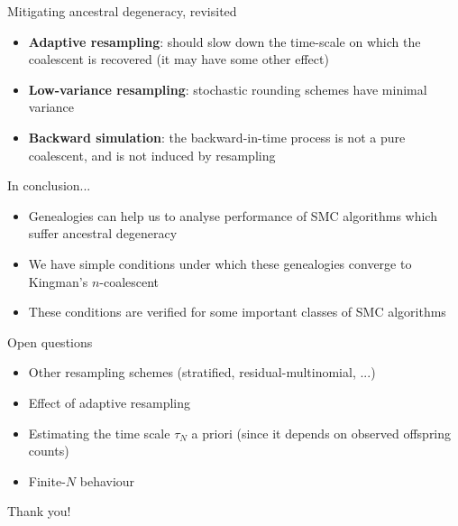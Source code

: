 \documentclass[aspectratio=169]{beamer}
\theoremstyle{definition}
\begin{document}
\begin{frame}{Mitigating ancestral degeneracy, revisited}
\begin{itemize}%
\item \textbf{Adaptive resampling}: should slow down the time-scale on which the coalescent is recovered (it may have some other effect)
\item \textbf{Low-variance resampling}: stochastic rounding schemes have minimal variance
\item \textbf{Backward simulation}: the backward-in-time process is not a pure coalescent, and is not induced by resampling
\end{itemize}
\end{frame}


\begin{frame}{In conclusion...}
\begin{itemize}
\item Genealogies can help us to analyse performance of SMC algorithms which suffer ancestral degeneracy
\item We have simple conditions under which these genealogies converge to Kingman's $n$-coalescent
\item These conditions are verified for some important classes of SMC algorithms
\end{itemize}
\end{frame}


\begin{frame}{Open questions}
\begin{itemize}
\item Other resampling schemes (stratified, residual-multinomial, ...)
\item Effect of adaptive resampling
\item Estimating the time scale $\tau_N$ a priori (since it depends on observed offspring counts)
\item Finite-$N$ behaviour
\end{itemize}
\end{frame}


\begin{frame}
\centering
\vspace{1cm}
{\Large Thank you!}
\end{frame}


\end{document}
